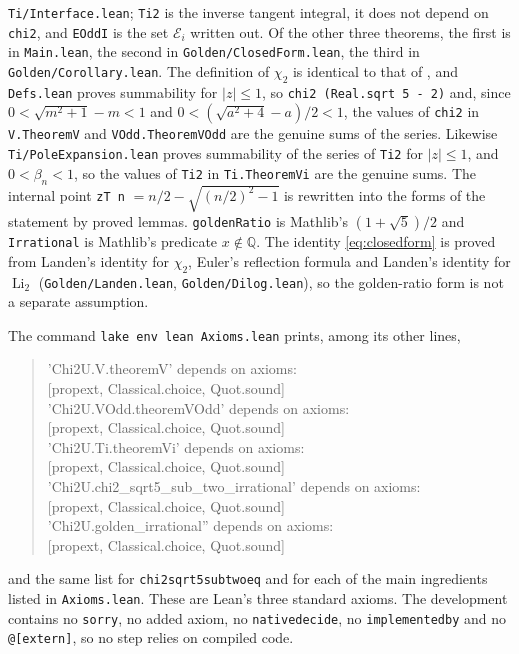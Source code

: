 \documentclass[11pt]{amsart}
\theoremstyle{definition}
\theoremstyle{remark}
\numberwithin{equation}{section}
\newcommand{\QQ}{\mathbb{Q}}
\newcommand{\cE}{\mathcal{E}}
\newcommand{\Li}{\operatorname{Li}}
\newcommand{\lean}[1]{{\def\_{\textunderscore\allowbreak}\texttt{#1}}}
\begin{document}
\lean{Ti\slash{}Interface.lean}; \lean{Ti2} is the inverse tangent integral, it does not depend on \lean{chi2}, and
\lean{EOddI} is the set $\cE_i$ written out. Of the
other three theorems, the first is in \lean{Main.lean}, the second in \lean{Golden\slash{}ClosedForm.lean}, the third in
\lean{Golden\slash{}Corollary.lean}. The definition of $\chi_2$ is identical to that of \cite{Chi2Repo}, and
\lean{Defs.lean} proves summability for $|z|\le1$, so \lean{chi2 (Real.sqrt 5 - 2)} and, since
$0<\sqrt{m^2+1}-m<1$ and $0<(\sqrt{a^2+4}-a)/2<1$, the values of \lean{chi2} in \lean{V.TheoremV} and
\lean{VOdd.TheoremVOdd} are the genuine sums of the series. Likewise \lean{Ti\slash{}PoleExpansion.lean} proves
summability of the series of \lean{Ti2} for $|z|\le1$, and $0<\beta_n<1$, so the values of \lean{Ti2} in
\lean{Ti.TheoremVi} are the genuine sums. The internal point \lean{zT n} $=n/2-\sqrt{(n/2)^2-1}$ is rewritten into the
forms of the statement by proved lemmas.
\lean{goldenRatio} is Mathlib's $(1+\sqrt5)/2$ and \lean{Irrational} is Mathlib's predicate $x\notin\QQ$. The identity
\eqref{eq:closedform} is proved from Landen's identity for $\chi_2$, Euler's reflection formula and Landen's identity for
$\Li_2$ (\lean{Golden\slash{}Landen.lean}, \lean{Golden\slash{}Dilog.lean}), so the golden-ratio form is not a separate
assumption.

The command \lean{lake env lean Axioms.lean} prints, among its other lines,
\begin{quote}\ttfamily\small
'Chi2U.V.theoremV' depends on axioms:\\
\hspace*{2em}[propext, Classical.choice, Quot.sound]\\
'Chi2U.VOdd.theoremVOdd' depends on axioms:\\
\hspace*{2em}[propext, Classical.choice, Quot.sound]\\
'Chi2U.Ti.theoremVi' depends on axioms:\\
\hspace*{2em}[propext, Classical.choice, Quot.sound]\\
'Chi2U.chi2\_sqrt5\_sub\_two\_irrational' depends on axioms:\\
\hspace*{2em}[propext, Classical.choice, Quot.sound]\\
'Chi2U.golden\_irrational'' depends on axioms:\\
\hspace*{2em}[propext, Classical.choice, Quot.sound]
\end{quote}
and the same list for \lean{chi2\_sqrt5\_sub\_two\_eq} and for each of the main ingredients listed in \lean{Axioms.lean}.
These are Lean's three standard axioms. The development contains no \lean{sorry}, no added axiom, no
\lean{native\_decide}, no \lean{implemented\_by} and no \lean{@[extern]}, so no step relies on compiled code.
\end{document}
